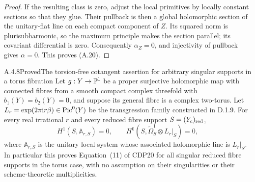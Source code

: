 \begin{proof}
If the resulting class is zero, adjust the local primitives by locally constant sections so that they glue. Their pullback is then a global holomorphic section of the unitary-flat line on each compact component of $Z$. Its squared norm is plurisubharmonic, so the maximum principle makes the section parallel; its covariant differential is zero. Consequently $\alpha_Z=0$, and injectivity of pullback gives $\alpha=0$. This proves (A.20).
\end{proof}



\begin{statement}{A.4.8}{Proved}{The torsion-free cotangent assertion for arbitrary singular supports in a torus fibration}
Let $g:Y\to\mathbb P^1$ be a proper surjective holomorphic map with connected fibres from a smooth compact complex threefold with $b_1(Y)=b_2(Y)=0$, and suppose its general fibre is a complex two-torus. Let $L_r=\exp(2\pi\mathrm i r\beta)\in\operatorname{Pic}^0(Y)$ be the transgression family constructed in D.1.9. For every real irrational $r$ and every reduced fibre support $S=(Y_c)_{\rm red}$,
\[
 H^1(S,\mathbb A_{r,S})=0,
 \qquad
 H^0(S,\widetilde\Omega_S^1\otimes L_r|_S)=0,
 \tag{A.21}
\]
where $\mathbb A_{r,S}$ is the unitary local system whose associated holomorphic line is $L_r|_S$. In particular this proves Equation~(11) of CDP20 for all singular reduced fibre supports in the torus case, with no assumption on their singularities or their scheme-theoretic multiplicities.
\end{statement}
